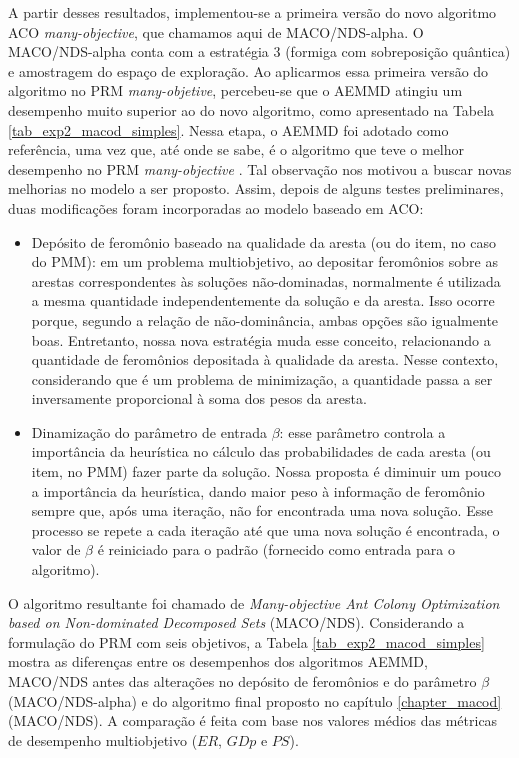 A partir desses resultados, implementou-se a primeira versão do novo algoritmo ACO \textit{many-objective}, que chamamos aqui de MACO/NDS-alpha. O MACO/NDS-alpha conta com a estratégia 3 (formiga com sobreposição quântica) e amostragem do espaço de exploração. Ao aplicarmos essa primeira versão do algoritmo no PRM \textit{many-objetive}, percebeu-se que o AEMMD atingiu um desempenho muito superior ao do novo algoritmo, como apresentado na Tabela \ref{tab_exp2_macod_simples}. Nessa etapa, o AEMMD foi adotado como referência, uma vez que, até onde se sabe, é o algoritmo que teve o melhor desempenho no PRM \textit{many-objective} \cite{LafetaThesis}. Tal observação nos motivou a buscar novas melhorias no modelo a ser proposto. Assim, depois de alguns testes preliminares, duas modificações foram incorporadas ao modelo baseado em ACO:

\begin{itemize}
	\item Depósito de feromônio baseado na qualidade da aresta (ou do item, no caso do PMM): em um problema multiobjetivo, ao depositar feromônios sobre as arestas correspondentes às soluções não-dominadas, normalmente é utilizada a mesma quantidade independentemente da solução e da aresta. Isso ocorre porque, segundo a relação de não-dominância, ambas opções são igualmente boas. Entretanto, nossa nova estratégia muda esse conceito, relacionando a quantidade de feromônios depositada à qualidade da aresta. Nesse contexto, considerando que é um problema de minimização, a quantidade passa a ser inversamente proporcional à soma dos pesos da aresta.
	\item Dinamização do parâmetro de entrada $\beta$: esse parâmetro controla a importância da heurística no cálculo das probabilidades de cada aresta (ou item, no PMM) fazer parte da solução. Nossa proposta é diminuir um pouco a importância da heurística, dando maior peso à informação de feromônio sempre que, após uma iteração, não for encontrada uma nova solução. Esse processo se repete a cada iteração até que uma nova solução é encontrada, o valor de $\beta$ é reiniciado para o padrão (fornecido como entrada para o algoritmo).
\end{itemize}

O algoritmo resultante foi chamado de \textit{Many-objective Ant Colony Optimization based on Non-dominated Decomposed Sets} (MACO/NDS). Considerando a formulação do PRM com seis objetivos, a Tabela \ref{tab_exp2_macod_simples} mostra as diferenças entre os desempenhos dos algoritmos AEMMD, MACO/NDS antes das alterações no depósito de feromônios e do parâmetro $\beta$ (MACO/NDS-alpha) e do algoritmo final proposto no capítulo \ref{chapter_macod} (MACO/NDS). A comparação é feita com base nos valores médios das métricas de desempenho multiobjetivo ($ER$, $GDp$ e $PS$).

